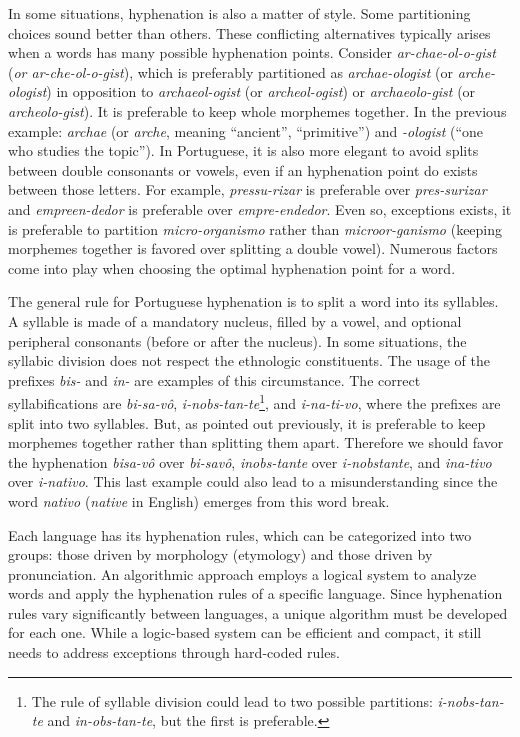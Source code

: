 \documentclass{article}
\begin{document}
In some situations, hyphenation is also a matter of style. Some partitioning
choices sound better than others. These conflicting alternatives typically
arises when a words has many possible hyphenation points. Consider
\emph{ar-chae-ol-o-gist} (\emph{or ar-che-ol-o-gist}), which is preferably partitioned as
\emph{archae-ologist} (or \emph{arche-ologist}) in opposition to \emph{archaeol-ogist} (or
\emph{archeol-ogist}) or \emph{archaeolo-gist} (or \emph{archeolo-gist}). It is preferable to keep
whole morphemes together. In the previous example: \emph{archae} (or \emph{arche}, meaning
``ancient'', ``primitive'')
and \emph{-ologist} (``one who studies the topic''). In Portuguese, it is also more
elegant to avoid splits between double consonants or vowels, even if an
hyphenation point do exists between those letters. For example,
\emph{pressu-rizar} is preferable over \emph{pres-surizar} and
\emph{empreen-dedor} is preferable over \emph{empre-endedor}. Even so,
exceptions exists, it is preferable to partition \emph{micro-organismo}
rather than \emph{microor-ganismo} (keeping morphemes together is favored
over splitting a double vowel). Numerous factors come into play when choosing
the optimal hyphenation point for a word.

The general rule for Portuguese hyphenation is to split a word into its
syllables. A syllable is made of a mandatory nucleus, filled by a vowel, and
optional peripheral consonants (before or after the nucleus). In some
situations, the syllabic division does not respect the ethnologic constituents.
The usage of the prefixes \emph{bis-} and \emph{in-} are examples of this
circumstance. The correct syllabifications are \emph{bi-sa-vô},
\emph{i-nobs-tan-te}\footnote{The rule of syllable
division could lead to two possible partitions: \emph{i-nobs-tan-te} and
\emph{in-obs-tan-te}, but the first is preferable.}, and \emph{i-na-ti-vo}, 
where the prefixes are split into two syllables. 
But, as pointed out previously, it is preferable to keep
morphemes together rather than splitting them apart. Therefore we should
favor the hyphenation \emph{bisa-vô} over \emph{bi-savô}, \emph{inobs-tante} 
over \emph{i-nobstante}, and \emph{ina-tivo} over \emph{i-nativo}. 
This last example could also lead to a misunderstanding
since the word \emph{nativo} (\emph{native} in English) emerges from this word
break. 

Each language has its hyphenation rules, which can be categorized into two
groups: those driven by morphology (etymology) and those driven by
pronunciation.  An algorithmic approach employs a logical system to analyze
words and apply the hyphenation rules of a specific language. Since hyphenation
rules vary significantly between languages, a unique algorithm must be
developed for each one. While a logic-based system can be efficient and
compact, it still needs to address exceptions through hard-coded rules.
\end{document}
